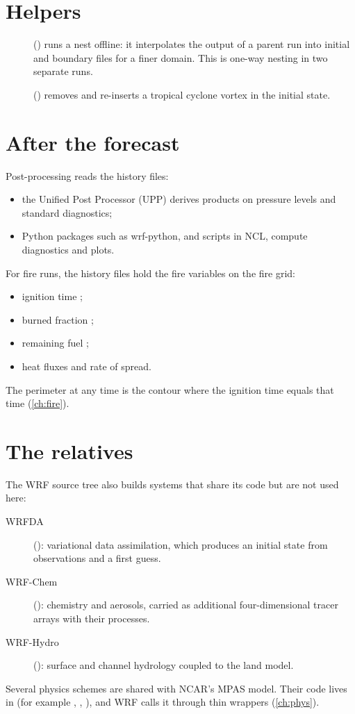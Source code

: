 \section{Helpers}

\begin{description}
  \item[] () runs a nest offline: it interpolates the output of a parent run
    into initial and boundary files for a finer domain. This is one-way nesting in two separate runs.
  \item[] () removes and re-inserts a tropical cyclone vortex in the initial
    state.
\end{description}

\section{After the forecast}

Post-processing reads the history files:
\begin{itemize}
  \item the Unified Post Processor (UPP) derives products on pressure levels and standard diagnostics;
  \item Python packages such as wrf-python, and scripts in NCL, compute diagnostics and plots.
\end{itemize}
For fire runs, the history files hold the fire variables on the fire grid:
\begin{itemize}
  \item ignition time ;
  \item burned fraction ;
  \item remaining fuel ;
  \item heat fluxes and rate of spread.
\end{itemize}
The perimeter at any time is the contour where the ignition time equals that time (\cref{ch:fire}).

\section{The relatives}

The WRF source tree also builds systems that share its code but are not used here:
\begin{description}
  \item[WRFDA] (): variational data assimilation, which produces an initial state from observations
    and a first guess.
  \item[WRF-Chem] (): chemistry and aerosols, carried as additional four-dimensional tracer arrays
    with their processes.
  \item[WRF-Hydro] (): surface and channel hydrology coupled to the land model.
\end{description}
Several physics schemes are shared with NCAR's MPAS model. Their code lives in  (for
example , , ), and WRF calls it through thin wrappers
(\cref{ch:phys}).

